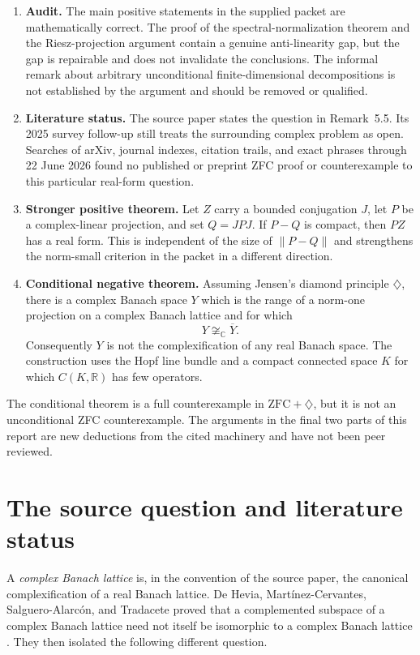 \documentclass[11pt]{article}
\theoremstyle{definition}
\theoremstyle{remark}
\newcommand{\C}{\mathbb C}
\newcommand{\R}{\mathbb R}
\begin{document}
\begin{enumerate}[label=\textbf{(\Alph*)},leftmargin=2.7em]
\item \textbf{Audit.} The main positive statements in the supplied packet are mathematically correct. The proof of the spectral-normalization theorem and the Riesz-projection argument contain a genuine anti-linearity gap, but the gap is repairable and does not invalidate the conclusions. The informal remark about arbitrary unconditional finite-dimensional decompositions is not established by the argument and should be removed or qualified.

\item \textbf{Literature status.} The source paper states the question in Remark~5.5. Its 2025 survey follow-up still treats the surrounding complex problem as open. Searches of arXiv, journal indexes, citation trails, and exact phrases through 22 June 2026 found no published or preprint ZFC proof or counterexample to this particular real-form question.

\item \textbf{Stronger positive theorem.} Let $Z$ carry a bounded conjugation $J$, let $P$ be a complex-linear projection, and set $Q=JPJ$. If $P-Q$ is compact, then $PZ$ has a real form. This is independent of the size of $\|P-Q\|$ and strengthens the norm-small criterion in the packet in a different direction.

\item \textbf{Conditional negative theorem.} Assuming Jensen's diamond principle $\diamondsuit$, there is a complex Banach space $Y$ which is the range of a norm-one projection on a complex Banach lattice and for which
\[
        Y\not\cong_{\C}\overline{Y}.
\]
Consequently $Y$ is not the complexification of any real Banach space. The construction uses the Hopf line bundle and a compact connected space $K$ for which $C(K,\R)$ has few operators.
\end{enumerate}

The conditional theorem is a full counterexample in $\mathrm{ZFC}+\diamondsuit$, but it is not an unconditional ZFC counterexample. The arguments in the final two parts of this report are new deductions from the cited machinery and have not been peer reviewed.

\section{The source question and literature status}

A \emph{complex Banach lattice} is, in the convention of the source paper, the canonical complexification of a real Banach lattice. De Hevia, Mart\'inez-Cervantes, Salguero-Alarc\'on, and Tradacete proved that a complemented subspace of a complex Banach lattice need not itself be isomorphic to a complex Banach lattice \cite{deHeviaEtAl}. They then isolated the following different question.
\end{document}
